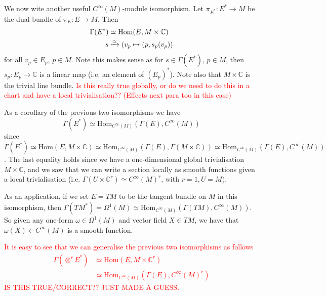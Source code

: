 \documentclass[a4paper]{article}
\theoremstyle{definition} \newtheorem*{definition}{Definition}
\theoremstyle{definition} \newtheorem*{definitions}{Definitions}
\theoremstyle{plain} \newtheorem{theorem}{Theorem}[section]
\theoremstyle{plain} \newtheorem{proposition}[theorem]{Proposition}
\theoremstyle{plain} \newtheorem{corollary}[theorem]{Corollary}
\theoremstyle{plain} \newtheorem{lemma}[theorem]{Lemma}
\theoremstyle{plain} \newtheorem{example}[theorem]{Example}
\newcommand{\checkCorrect}[1]{\textcolor{red}{#1}}
\newcommand{\complexnos}{\mathbb{C}}
\begin{document}
We now wite another useful $C^\infty(M)$-module isomorphism. Let $\pi_{E^\ast}:E^\ast \to M$ be the dual bundle of $\pi_E:E \to M$. Then 
\begin{align*}
\Gamma(E^\ast) & \simeq \text{Hom}(E, M\times \complexnos) \\
s & \xmapsto{\simeq} (v_p\mapsto (p, s_p(v_p))
\end{align*}
for all $v_p\in E_p$, $p\in M$. Note this makes sense as for $s\in \Gamma(E^*)$, $p\in M$, then $s_p:E_p\to \complexnos$ is a linear map (i.e. an element of $(E_p)^*$).
Note also that $M\times \complexnos$ is the trivial line bundle. \checkCorrect{Is this really true globally, or do we need to do this in a chart and have a local trivialisation?? (Effects next para too in this case)}

As a corollary of the previous two isomorphisms we have 
$$\Gamma(E^\ast)\simeq \text{Hom}_{C^\infty (M)}(\Gamma(E), C^\infty (M))$$
since $\Gamma(E^\ast) \simeq \text{Hom}(E, M\times \complexnos) \simeq \text{Hom}_{C^\infty (M)}(\Gamma(E), \Gamma(M\times \complexnos))\simeq \text{Hom}_{C^\infty (M)}(\Gamma(E), C^\infty (M))$. The last equality holds since we have a one-dimensional global trivialisation $M\times \complexnos$, and we saw that we can write a section locally as smooth functions given a local trivialisation (i.e. $\Gamma(U\times \complexnos^r)\simeq C^\infty (M)^r$, with $r=1, U=M)$.

As an application, if we set $E=TM$ to be the tangent bundle on $M$ in this isomorphism, then $\Gamma(TM^*) = \Omega^1(M) \simeq \text{Hom}_{C^\infty (M)}(\Gamma(TM), C^\infty (M))$. So given any one-form $\omega\in \Omega^1(M)$ and vector field $X\in TM$, we have that $\omega(X)\in C^\infty(M)$ is a smooth function.

\checkCorrect{
It is easy to see that we can generalise the previous two isomorphisms as follows
\begin{align*}
\Gamma(\otimes^r E^\ast) & \simeq \text{Hom}(E, M\times \complexnos^r) \\
 & \simeq \text{Hom}_{C^\infty (M)}(\Gamma(E), C^\infty (M)^r)
\end{align*}
} \checkCorrect{IS THIS TRUE/CORRECT?? JUST MADE A GUESS.}
\end{document}
